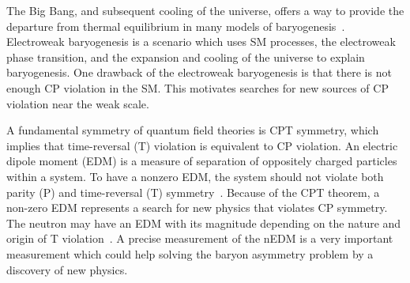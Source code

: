 The Big Bang, and subsequent cooling of the universe, offers a way to provide the departure from thermal equilibrium in many models of baryogenesis~\cite{sakharov_3rd_cond}. Electroweak baryogenesis is a scenario which uses SM processes, the electroweak phase transition, and the expansion and cooling of the universe to explain baryogenesis. One drawback of the electroweak baryogenesis is that there is not enough CP violation in the SM. This motivates searches for new sources of CP violation near the weak scale.


A fundamental symmetry of quantum field theories is CPT symmetry, which implies that time-reversal (T) violation is equivalent to CP violation.  An electric dipole moment (EDM) is a measure of separation of oppositely charged particles within a system. To have a nonzero EDM, the system should not violate both parity (P) and time-reversal (T) symmetry~\cite{edm_reason}. Because of the CPT theorem, a non-zero EDM represents a search for new physics that violates CP symmetry. The neutron may have an EDM with its magnitude depending on the nature and origin of T violation~\cite{nEDM_reason}. A precise measurement of the nEDM is a very important measurement which could help solving the baryon asymmetry problem by a discovery of new physics.




